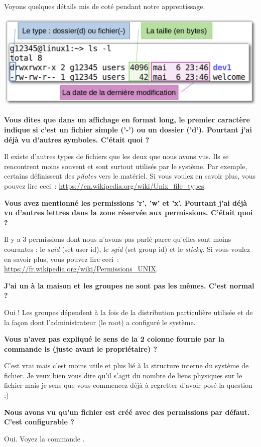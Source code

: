 \documentclass[a4paper,11pt]{style-esi/td}
\begin{document}
		Voyons quelques détails mis de coté pendant notre apprentissage.

		\begin{center}
			\includegraphics[width=.7\textwidth]{image/reste.pdf}
		\end{center}

		\begin{faq}
			\textbf{%
				Vous dites que dans un affichage en format long, 
				le premier caractère indique si c'est un fichier simple ('-') ou un dossier ('d'). 
				Pourtant j'ai déjà vu d'autres symboles. C'était quoi ?
			}
			
			Il existe d'autres types de fichiers que les deux que nous avons vus. 
			Ils se rencontrent moins souvent et sont surtout utilisés par le système.
			Par exemple, certains définissent des \textit{pilotes} vers le matériel. 
			Si vous voulez en savoir plus, vous pouvez lire ceci~:
			\url{https://en.wikipedia.org/wiki/Unix\_file\_types}.  

			\medskip
			\textbf{%
				Vous avez mentionné les permissions 'r', 'w' et 'x'. 
				Pourtant j'ai déjà vu d'autres lettres dans la zone réservée aux permissions. 
				C'était quoi ?
			}

			Il y a 3 permissions dont nous n'avons pas parlé parce qu'elles sont moins courantes : 
			le \textit{suid} (set user id), le \textit{sgid} (set group id) 
			et le \textit{sticky}. 
			Si vous voulez en savoir plus, vous pouvez lire ceci~:
			\url{https://fr.wikipedia.org/wiki/Permissions\_UNIX}.  

			\medskip
			\textbf{%
				J'ai un  à la maison et les groupes ne sont pas les mêmes. 
				C'est normal ?
			}

			Oui ! 
			Les groupes dépendent à la fois de la distribution particulière utilisée
			et de la façon dont l'administrateur (le root) a configuré le système.   

			\medskip
			\textbf{%
				Vous n'avez pas expliqué le sens de la 2\ieme{} colonne 
				fournie par la commande ls (juste avant le propriétaire) ?
			}

			C'est vrai mais c'est moins utile 
			et plus lié à la structure interne du système de fichier. 
			Je veux bien vous dire qu'il s'agit 
			du nombre de liens physiques sur le fichier 
			mais je sens que vous commencez déjà à regretter d'avoir posé la question ;)  

			\medskip
			\textbf{%
				Nous avons vu qu'un fichier est créé avec des permissions par défaut. 
				C'est configurable ?
			}

			Oui. Voyez la commande .  
		\end{faq}
\end{document}
